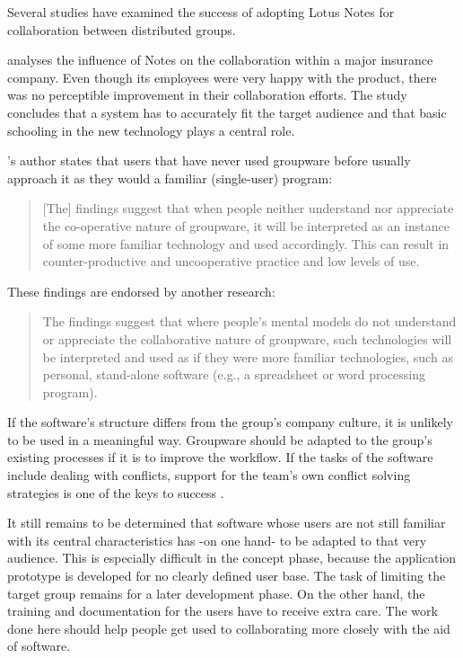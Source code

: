 Several studies have examined the success of adopting Lotus Notes for collaboration between distributed groups.

 analyses the influence of Notes on the collaboration within a major insurance company. Even though its employees were very happy with the product, there was no perceptible improvement in their collaboration efforts. The study concludes that a system has to accurately fit the target audience and that basic schooling in the new technology plays a central role.

's author states that users that have never used groupware before usually approach it as they would a familiar (single-user) program:

\begin{quote}
[The] findings suggest that when people neither understand nor appreciate the co-operative nature of groupware, it will be interpreted as an instance of some more familiar technology and used accordingly. This can result in counter-productive and uncooperative practice and low levels of use.  
\end{quote}

These findings are endorsed by another research:

\begin{quote}
The findings suggest that where people's mental models do not understand or appreciate the collaborative nature of groupware, such technologies will be interpreted and used as if they were more familiar technologies, such as personal, stand-alone software (e.g., a spreadsheet or word processing program). 
\end{quote}

If the software's structure differs from the group's company culture, it is unlikely to be used in a meaningful way. Groupware should be adapted to the group's existing processes if it is to improve the workflow. If the tasks of the software include dealing with conflicts, support for the team's own conflict solving strategies is one of the keys to success .

It still remains to be determined that software whose users are not still familiar with its central characteristics has -on one hand- to be adapted to that very audience. This is especially difficult in the concept phase, because the application prototype is developed for no clearly defined user base. The task of limiting the target group remains for a later development phase. On the other hand, the training and documentation for the users have to receive extra care. The work done here should help people get used to collaborating more closely with the aid of software.


